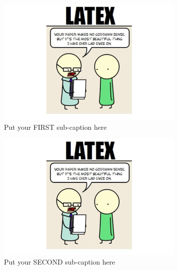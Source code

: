 \documentclass[a4paper]{article}
\begin{document}
\begin{figure}[ht]
\begin{subfigure}{.5\textwidth}
  \centering
  \includegraphics[width=1\linewidth]{./fig-latex.jpg}  
  \caption{Put your FIRST sub-caption here}
  \label{fig:sub-first}
\end{subfigure}
\begin{subfigure}{.5\textwidth}
  \centering
  \includegraphics[width=1\linewidth]{./fig-latex.jpg}  
  \caption{Put your SECOND sub-caption here}
  \label{fig:sub-second}
\end{subfigure}
\begin{subfigure}{.3\textwidth}
  \centering

\end{subfigure}
\end{figure}
\end{document}
